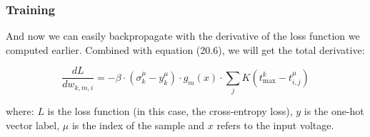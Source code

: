 \subsubsection{Training}

And now we can easily backpropagate with the derivative of the loss function we computed earlier. Combined with equation (20.6), we will get the total derivative:

\begin{equation}
    \frac{dL}{dw_{k,m,i}} = -\beta \cdot (\sigma_k^\mu - y_k^\mu) \cdot g_m(x) \cdot \sum_j K (t_{\text{max}}^k - t_{i,j}^\mu)
\end{equation}

where:
$L$ is the loss function (in this case, the cross-entropy loss),
$y$ is the one-hot vector label,
$\mu$ is the index of the sample and
$x$ refers to the input voltage.
